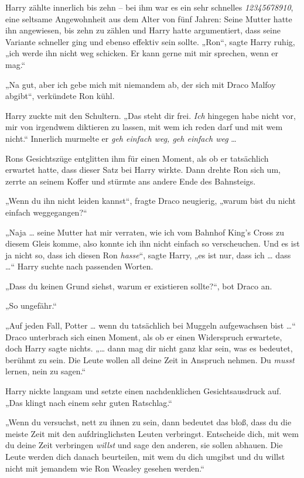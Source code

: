 {Harry zählte innerlich bis zehn -- bei ihm war es ein sehr schnelles \emph{12345678910}, eine seltsame Angewohnheit aus dem Alter von fünf Jahren: Seine Mutter hatte ihn angewiesen, bis zehn zu zählen und Harry hatte argumentiert, dass seine Variante schneller ging und ebenso effektiv sein sollte. „Ron“, sagte Harry ruhig, „ich werde ihn nicht weg schicken. Er kann gerne mit mir sprechen, wenn er mag.“

„Na gut, aber ich gebe mich mit niemandem ab, der sich mit Draco Malfoy abgibt“, verkündete Ron kühl.

Harry zuckte mit den Schultern. „Das steht dir frei. \emph{Ich} hingegen habe nicht vor, mir von irgendwem diktieren zu lassen, mit wem ich reden darf und mit wem nicht.“ Innerlich murmelte er \emph{geh einfach weg, geh einfach weg} …

Rons Gesichtszüge entglitten ihm für einen Moment, als ob er tatsächlich erwartet hatte, dass dieser Satz bei Harry wirkte. Dann drehte Ron sich um, zerrte an seinem Koffer und stürmte ans andere Ende des Bahnsteigs.

„Wenn du ihn nicht leiden kannst“, fragte Draco neugierig, „warum bist du nicht einfach weggegangen?“

„Naja … seine Mutter hat mir verraten, wie ich vom Bahnhof King's Cross zu diesem Gleis komme, also konnte ich ihn nicht einfach so verscheuchen. Und es ist ja nicht so, dass ich diesen Ron \emph{hasse}“, sagte Harry, „es ist nur, dass ich … dass …“ Harry suchte nach passenden Worten.

„Dass du keinen Grund siehst, warum er existieren sollte?“, bot Draco an.

„So ungefähr.“

„Auf jeden Fall, Potter … wenn du tatsächlich bei Muggeln aufgewachsen bist …“ Draco unterbrach sich einen Moment, als ob er einen Widerspruch erwartete, doch Harry sagte nichts. „… dann mag dir nicht ganz klar sein, was es bedeutet, berühmt zu sein. Die Leute wollen all deine Zeit in Anspruch nehmen. Du \emph{musst} lernen, nein zu sagen.“

Harry nickte langsam und setzte einen nachdenklichen Gesichtsausdruck auf. „Das klingt nach einem sehr guten Ratschlag.“

„Wenn du versuchst, nett zu ihnen zu sein, dann bedeutet das bloß, dass du die meiste Zeit mit den aufdringlichsten Leuten verbringst. Entscheide dich, mit wem du deine Zeit verbringen \emph{willst} und sage den anderen, sie sollen abhauen. Die Leute werden dich danach beurteilen, mit wem du dich umgibst und du willst nicht mit jemandem wie Ron Weasley gesehen werden.“

}
